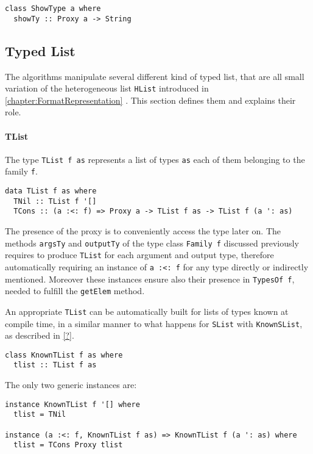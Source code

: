 \documentclass[../Thesis.tex]{subfiles}
\begin{document}
\begin{verbatim}
class ShowType a where
  showTy :: Proxy a -> String
\end{verbatim}
	
	\subsection{Typed List}
	The algorithms manipulate several different kind of typed list,
	that are all small variation of the heterogeneous list \texttt{HList} 
	introduced in \ref{chapter:FormatRepresentation} . This section defines them and explains their role.
	
	\paragraph{TList}
	The type \texttt{TList f as} represents a list of types \texttt{as} each 
	of them belonging to the family \texttt{f}.

\begin{verbatim}
data TList f as where
  TNil :: TList f '[]
  TCons :: (a :<: f) => Proxy a -> TList f as -> TList f (a ': as)
\end{verbatim}

	The presence of the proxy is to conveniently access the type later on.
	The methods \texttt{argsTy} and \texttt{outputTy} of the type class
	\texttt{Family f} discussed previously requires to produce \texttt{TList}
	for each argument and output type, therefore automatically requiring
	an instance of \texttt{a :<: f} for any type directly or indirectly mentioned. 
	Moreover	these instances ensure also their presence in \texttt{TypesOf f},
	needed to fulfill the \texttt{getElem} method.
	
	An appropriate \texttt{TList} can be automatically built for lists of types 
	known at compile time, in a similar manner to what happens for
	\texttt{SList} with \texttt{KnownSList}, as described in \ref{?}.
	
\begin{verbatim}
class KnownTList f as where
  tlist :: TList f as
\end{verbatim}
	The only two generic instances are:
\begin{verbatim}
instance KnownTList f '[] where
  tlist = TNil

instance (a :<: f, KnownTList f as) => KnownTList f (a ': as) where
  tlist = TCons Proxy tlist
\end{verbatim}
\end{document}
